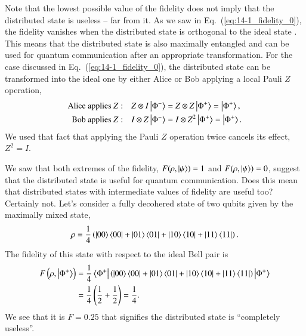 Note that the lowest possible value of the fidelity does not imply that the distributed state is useless -- far from it.
As we saw in Eq.~(\ref{eq:14-1_fidelity_0}), the fidelity vanishes when the distributed state is orthogonal to the ideal state \ket{\Phi^+}.
This means that the distributed state is also maximally entangled and can be used for quantum communication after an appropriate transformation.
For the case discussed in Eq.~(\ref{eq:14-1_fidelity_0}), the distributed state can be transformed into the ideal one by either Alice or Bob applying a local Pauli $Z$ operation,
\begin{align}
    \text{Alice applies } Z: \quad & Z \otimes I \ket{\Phi^-} = Z \otimes Z \ket{\Phi^+} = \ket{\Phi^+}, \\
    \text{Bob applies } Z: \quad & I \otimes Z \ket{\Phi^-} = I \otimes Z^2 \ket{\Phi^+} = \ket{\Phi^+}.
\end{align}
We used that fact that applying the Pauli $Z$ operation twice cancels its effect, $Z^2 = I$.

We saw that both extremes of the fidelity, $F(\rho,\left| \psi \right\rangle) = 1$ and $F(\rho,\left| \psi \right\rangle) = 0$, suggest that the distributed state is useful for quantum communication.
Does this mean that distributed states with intermediate values of fidelity are useful too?
Certainly not.
Let's consider a fully decohered state of two qubits given by the maximally mixed state,
\begin{equation}
    \rho = \frac{1}{4} \left( \left| 00 \right\rangle\left\langle 00 \right| + \left| 01 \right\rangle\left\langle 01 \right| + \left| 10 \right\rangle\left\langle 10 \right| + \left| 11 \right\rangle\left\langle 11 \right| \right).
\end{equation}
The fidelity of this state with respect to the ideal Bell pair \ket{\Phi^+} is
\begin{align}
    F \left( \rho, \left| \Phi^+ \right\rangle \right) & = \frac{1}{4} \left\langle \Phi^+ \right| \left( \left| 00 \right\rangle\left\langle 00 \right| + \left| 01 \right\rangle\left\langle 01 \right| + \left| 10 \right\rangle\left\langle 10 \right| + \left| 11 \right\rangle\left\langle 11 \right| \right) \left| \Phi^+ \right\rangle \nonumber\\
    & = \frac{1}{4} \left( \frac{1}{2} + \frac{1}{2} \right) = \frac{1}{4}.
\end{align}
We see that it is $F=0.25$ that signifies the distributed state is ``completely useless''.

